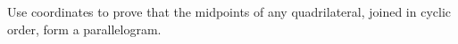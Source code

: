 Use coordinates to prove that the midpoints of any quadrilateral, joined in cyclic order, form a parallelogram.
